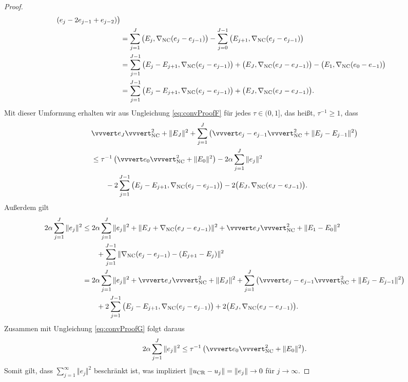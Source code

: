 \begin{proof}
\begin{align*}
    (e_j-2e_{j-1}+e_{j-2})\big)\\
    &=\sum_{j=1}^J\big(E_j,\nabla_\textup{NC}(e_j-e_{j-1})\big)
    -
    \sum_{j=0}^{J-1}\big(E_{j+1},\nabla_\textup{NC}(e_j-e_{j-1})\big) \\
    &= 
    \sum_{j=1}^{J-1} 
    \big(E_j-E_{j+1},\nabla_\textup{NC}(e_j-e_{j-1})\big)
    +\big(E_J,\nabla_\textup{NC}(e_J-e_{J-1})\big)
    - \big(E_1, \nabla_\textup{NC}(e_0-e_{-1})\big) \\
    &= 
    \sum_{j=1}^{J-1} 
    \big(E_j-E_{j+1},\nabla_\textup{NC}(e_j-e_{j-1})\big)
    +\big(E_J,\nabla_\textup{NC}(e_J-e_{J-1})\big).
  \end{align*}
  Mit dieser Umformung erhalten wir aus Ungleichung \eqref{eq:convProofF} für
  jedes $\tau\in(0,1]$, das heißt, $\tau^{-1}\geq 1$, dass
  \begin{equation}
    \label{eq:convProofG}
    \begin{aligned}
      &\vvvert e_J \vvvert^2_\nc +\Vert E_J \Vert^2 
      +\sum_{j=1}^J\left(\vvvert e_j-e_{j-1} \vvvert_\nc^2 + 
      \Vert E_j-E_{j-1}\Vert^2\right) \\
      &\leq 
      \tau^{-1}\left(\vvvert e_0 \vvvert_\nc^2 + \Vert E_0 \Vert^2 \right)
      -2\alpha\sum_{j=1}^J \Vert e_j\Vert^2 \\
      &\quad\quad
      -2 \sum_{j=1}^{J-1} \big(E_j-E_{j+1},\gradnc(e_j-e_{j-1})\big)
      -2\big(E_J,\gradnc(e_J-e_{J-1})\big).
    \end{aligned}
  \end{equation}
  Außerdem gilt
  \begin{align*}
    2\alpha\sum_{j=1}^J\Vert e_j\Vert^2 
    &\leq
    2\alpha\sum_{j=1}^J\Vert e_j\Vert^2
    +\Vert E_J + \gradnc(e_J-e_{J-1}) \Vert^2 
    + \vvvert e_J \vvvert^2_\nc 
    + \Vert E_1 - E_0 \Vert^2 \\
    &\quad\quad
    + \sum_{j=1}^{J-1}  
      \Vert \gradnc(e_j-e_{j-1}) - (E_{j+1} - E_j ) \Vert^2 \\
    &= 
    2\alpha\sum_{j=1}^J\Vert e_j\Vert^2
    +\vvvert e_J \vvvert^2_\nc + \Vert E_J \Vert^2 
    + \sum_{j=1}^J \left( \vvvert e_j-e_{j-1} \vvvert^2_\nc
    + \Vert E_j - E_{j-1} \Vert^2 \right)\\
    &\quad\quad
    + 2\sum_{j=1}^{J-1}\big(E_j-E_{j+1},\gradnc(e_j-e_{j-1})\big)
    + 2\big(E_{J},\gradnc(e_J-e_{J-1})\big).
  \end{align*}
  Zusammen mit Ungleichung \eqref{eq:convProofG} folgt daraus
  \begin{align}
    \label{eq:upperBoundIterationError}
    2\alpha\sum_{j=1}^J\Vert e_j\Vert^2 
    \leq
    \tau^{-1}\left(\vvvert e_0\vvvert^2_\nc + \Vert E_0\Vert^2\right)\!.
  \end{align}
  Somit gilt, dass $\sum_{j=1}^\infty \Vert e_j\Vert^2$ beschränkt
  ist, was impliziert $\Vert u_\textup{CR}-u_j\Vert=\Vert e_j\Vert\rightarrow 0$ für
  $j\rightarrow \infty$.
\end{proof}

